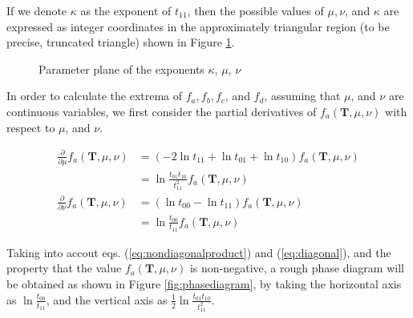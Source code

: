 ﻿\documentclass[a3paper,xelatex,english]{bxjsarticle}
\newcommand\mib[1]{\boldsymbol{#1}}
\begin{document}
If we denote $\kappa$ as the exponent of $t_{11}$, then the possible values of $\mu, \nu$, and $\kappa$ are expressed as integer coordinates in the approximately triangular region (to be precise, truncated triangle) shown in Figure \ref{fig:parameterplane}.
\begin{figure}[htbp]
\centering


\caption{Parameter plane of the exponents $\kappa$, $\mu$, $\nu$}
\label{fig:parameterplane}
\end{figure}

In order to calculate the extrema of $f_{a}, f_{b}, f_{c}$, and $f_{d}$, assuming that $\mu$, and $\nu$ are continuous variables, we first consider the partial derivatives of $f_{a}(\mib{T}, \mu, \nu)$ with respect to $\mu$, and $\nu$.

\begin{align}
	\frac{\partial }{\partial \mu} f_{a}(\mib{T}, \mu, \nu) 
	&= 
	(-2 \ln t_{11} + \ln t_{01} + \ln t_{10}) f_{a}(\mib{T}, \mu, \nu) 
	\nonumber \\
	&= 
	\ln \frac{t_{01} t_{10}}{t_{11}^{2}} 
	f_{a}(\mib{T}, \mu, \nu) 
	\label{eq:nondiagonalproduct}
	\\
	\frac{\partial }{\partial \nu} f_{a}(\mib{T}, \mu, \nu) 
	&= 
	(\ln t_{00} - \ln t_{11}) f_{a}(\mib{T}, \mu, \nu) 
	\nonumber \\
	&= 
	\ln \frac{t_{00}}{t_{11}} 
	f_{a}(\mib{T}, \mu, \nu) 
	\label{eq:diagonal}
\end{align}


Taking into accout eqs. (\ref{eq:nondiagonalproduct}) and (\ref{eq:diagonal}), and the property that the value $f_{a}(\mib{T}, \mu, \nu)$ is non-negative, 
a rough phase diagram will be obtained as shown in Figure \ref{fig:phasediagram}, by taking the horizontal axis as $\ln \frac{t_{00}}{t_{11}}$, and the vertical axis as $\tfrac{1}{2}\ln \frac{t_{01} t_{10}}{t_{11}^{2}}$.
\end{document}
